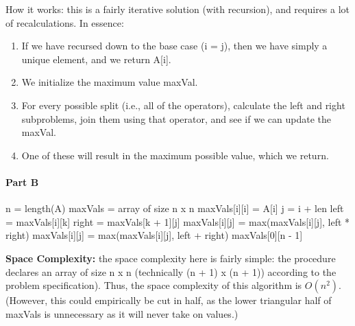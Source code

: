 \documentclass[11pt]{article}
\begin{document}
How it works: this is a fairly iterative solution (with recursion), and requires a lot of recalculations. In essence:

\begin{enumerate}
    \item If we have recursed down to the base case (i = j), then we have simply a unique element, and we return A[i].
    \item We initialize the maximum value maxVal.
    \item For every possible split (i.e., all of the operators), calculate the left and right subproblems, join them using that operator, and see if we can update the maxVal.
    \item One of these will result in the maximum possible value, which we return.
\end{enumerate}

\newpage

\paragraph{Part B}

\begin{algorithmic}[1]
    \State n = length(A)
        \State maxVals = array of size n x n 
            \State maxVals[i][i] = A[i] 
        \EndFor
                \State j = i + len
                    \State left = maxVals[i][k]
                    \State right = maxVals[k + 1][j]
                        \State maxVals[i][j] = max(maxVals[i][j], left * right)
                    \Else
                        \State maxVals[i][j] = max(maxVals[i][j], left + right)
                    \EndIf
                \EndFor
            \EndFor
        \EndFor
        \State \Return maxVals[0][n - 1]
    \EndProcedure
\end{algorithmic}

\textbf{Space Complexity:} the space complexity here is fairly simple: the procedure declares an array of size n x n (technically (n + 1) x (n + 1)) according to the problem specification). Thus, the space complexity of this algorithm is $O(n^2)$. (However, this could empirically be cut in half, as the lower triangular half of maxVals is unnecessary as it will never take on values.)
\end{document}
